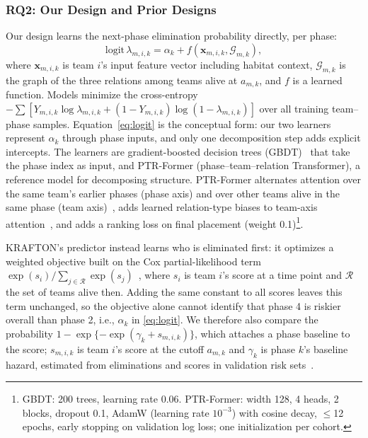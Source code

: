 \documentclass[conference]{IEEEtran}
\begin{document}
\subsubsection{RQ2: Our Design and Prior Designs}
\label{sec:method:rq2}
Our design learns the next-phase elimination probability directly, per phase:
\begin{equation}
\mathrm{logit}\,\lambda_{m,i,k}=\alpha_k+f(\mathbf{x}_{m,i,k},\mathcal{G}_{m,k}),
\label{eq:logit}
\end{equation}
where $\mathbf{x}_{m,i,k}$ is team $i$'s input feature vector including habitat context, $\mathcal{G}_{m,k}$ is the graph of the three relations among teams alive at $a_{m,k}$, and $f$ is a learned function.
Models minimize the cross-entropy $-\sum[Y_{m,i,k}\log\lambda_{m,i,k}+(1-Y_{m,i,k})\log(1-\lambda_{m,i,k})]$ over all training team--phase samples.
Equation~\eqref{eq:logit} is the conceptual form: our two learners represent $\alpha_k$ through phase inputs, and only one decomposition step adds explicit intercepts. The learners are gradient-boosted decision trees (GBDT)~\cite{Friedman01} that take the phase index as input, and PTR-Former (phase--team--relation Transformer), a reference model for decomposing structure.
PTR-Former alternates attention over the same team's earlier phases (phase axis) and over other teams alive in the same phase (team axis)~\cite{Vaswani17}, adds learned relation-type biases to team-axis attention~\cite{Ying21}, and adds a ranking loss on final placement (weight 0.1)\footnote{GBDT: 200 trees, learning rate 0.06. PTR-Former: width 128, 4 heads, 2 blocks, dropout 0.1, AdamW (learning rate $10^{-3}$) with cosine decay, $\le$12 epochs, early stopping on validation log loss; one initialization per cohort.}.

KRAFTON's predictor instead learns who is eliminated first: it optimizes a weighted objective built on the Cox partial-likelihood term $\exp(s_i)/\sum_{j\in\mathcal{R}}\exp(s_j)$~\cite{Cox72}, where $s_i$ is team $i$'s score at a time point and $\mathcal{R}$ the set of teams alive then.
Adding the same constant to all scores leaves this term unchanged, so the objective alone cannot identify that phase 4 is riskier overall than phase 2, i.e., $\alpha_k$ in \eqref{eq:logit}.
We therefore also compare the probability $1-\exp\{-\exp(\gamma_k+s_{m,i,k})\}$, which attaches a phase baseline to the score; $s_{m,i,k}$ is team $i$'s score at the cutoff $a_{m,k}$ and $\gamma_k$ is phase $k$'s baseline hazard, estimated from eliminations and scores in validation risk sets~\cite{PrenticeGloeckler78}.
\end{document}
